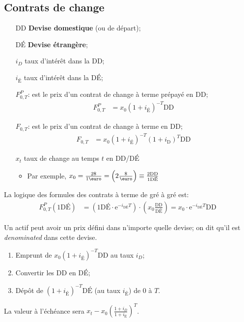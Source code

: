\documentclass[10pt, french]{article}
\begin{document}
\begin{multicols*}{2}
\subsection*{Contrats de change}
\begin{distributions}
\begin{itemize}
	\item[DD] \textbf{Devise domestique} (ou de départ);
	\item[DÉ] \textbf{Devise étrangère};
	\item[$i_{D}$]	taux d'intérêt dans la DD;
	\item[$i_{\text{É}}$]	taux d'intérêt dans la DÉ;
	\item[$F_{0, T}^{P}$:]	est le prix d'un contrat de change à terme prépayé en DD;
	\begin{align*}
	F_{0, T}^{P} &= x_{0}(1 + i_{\text{É}})^{-T}\text{DD}
	\end{align*}		
	\item[$F_{0, T}$:]	est le prix d'un contrat de change à terme en DD;
	\begin{align*}
	F_{0, T} &= x_{0}(1 + i_{\text{É}})^{-T}(1 + i_{\text{D}})^{T}\text{DD}	
	\end{align*}		
	\item[$x_{t}$]	taux de change au temps $t$ en DD/DÉ
		\begin{itemize}[leftmargin = *]
		\item	Par exemple, $x_{0} = \frac{2\$}{\text{1\euro}} = \left(2 \frac{\$}{\text{\euro}}\right) \equiv \frac{2\text{DD}}{1\text{DÉ}}$
		\end{itemize}
\end{itemize}

La logique des formules des contrats à terme de gré à gré est:
\begin{align*}
	F_{0, T}^{P}(1 \text{DÉ})
	&=	\left(1\text{DÉ} \cdot \textrm{e}^{-i_{\text{DÉ}}T}\right) \cdot \left( x_{0}\frac{\text{DD}}{\text{DÉ}} \right)	
	=	x_{0} \cdot \textrm{e}^{-i_{\text{DÉ}}T}\text{DD}
\end{align*}
\end{distributions}

Un actif peut avoir un prix défini dans n'importe quelle devise; on dit qu'il est \og \textit{denominated} \fg{} dans cette devise.

\begin{definitionNOHFILL}
\begin{enumerate}
	\item	Emprunt de $x_0(1 + i_{\text{É}})^{-T}\text{DD}$ au taux $i_D$;
	\item 	Convertir les DD en DÉ;
	\item	Dépôt de $(1 + i_{É})^{-T}\text{DÉ}$ (au taux $i_{É}$) de 0 à $T$.
\end{enumerate}
La valeur à l'échéance sera $x_t - x_0 \left(\frac{1 + i_D}{1 + i_{\text{É}}}\right)^{T}$.
\end{definitionNOHFILL}


\end{multicols*}
\end{document}
